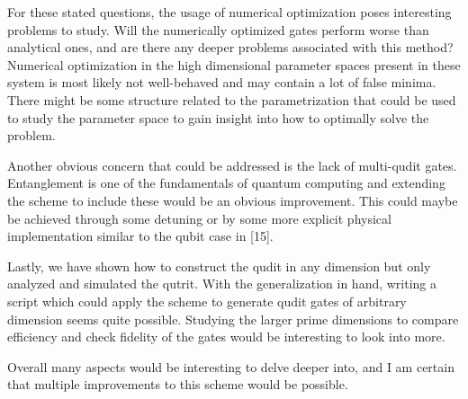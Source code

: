 For these stated questions, the usage of numerical optimization poses interesting problems to study. Will the numerically optimized gates perform worse than analytical ones, and are there any deeper problems associated with this method? Numerical optimization in the high dimensional parameter spaces present in these system is most likely not well-behaved and may contain a lot of false minima. There might be some structure related to the parametrization that could be used to study the parameter space to gain insight into how to optimally solve the problem.
 
Another obvious concern that could be addressed is the lack of multi-qudit gates. Entanglement is one of the fundamentals of quantum computing and extending the scheme to include these would be an obvious improvement. This could maybe be achieved through some detuning or by some more explicit physical implementation similar to the qubit case in [15].

Lastly, we have shown how to construct the qudit in any dimension but only analyzed and simulated the qutrit. With the generalization in hand, writing a script which could apply the scheme to generate qudit gates of arbitrary dimension seems quite possible. Studying the larger prime dimensions to compare efficiency and check fidelity of the gates would be interesting to look into more.

Overall many aspects would be interesting to delve deeper into, and I am certain that multiple improvements to this scheme would be possible.

